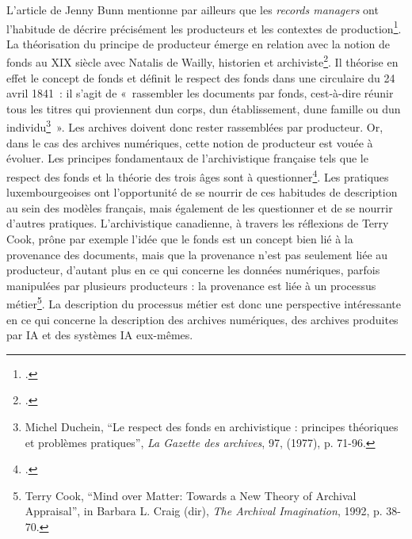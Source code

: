 	L'article de Jenny Bunn mentionne par ailleurs que les \emph{records managers} ont
	l'habitude de décrire précisément les producteurs et les contextes de
	production\footcite{bunn_working_2020}. La théorisation du principe de producteur
	émerge en relation avec la notion de fonds au XIX siècle avec Natalis
	de Wailly, historien et archiviste\footcite{guyon_theorie_2023}. Il
	théorise en effet le concept de fonds et définit le respect des fonds
	dans une circulaire du 24 avril 1841~: il s'agit de «~rassembler les
	documents par fonds, c\textquotesingle est-à-dire réunir tous les titres
	qui proviennent d\textquotesingle un corps, d\textquotesingle un
	établissement, d\textquotesingle une famille ou d\textquotesingle un
	individu\footnote{Michel Duchein, \enquote{Le respect des fonds en archivistique : principes théoriques et problèmes pratiques}, \emph{La Gazette des archives}, 97, (1977), p. 71-96.}~». Les archives doivent donc rester
	rassemblées par producteur. Or, dans le cas des archives numériques,
	cette notion de producteur est vouée à évoluer. Les principes
	fondamentaux de l'archivistique française tels que le respect des fonds
	et la théorie des trois âges sont à questionner\footcite{guyon_theorie_2023}. Les pratiques luxembourgeoises ont l'opportunité de se nourrir
	de ces habitudes de description au sein des modèles français, mais
	également de les questionner et de se nourrir d'autres pratiques.
	L'archivistique canadienne, à travers les réflexions de Terry Cook,
	prône par exemple l'idée que le fonds est un concept bien lié à la provenance
	des documents, mais que la provenance n'est pas seulement liée au
	producteur, d'autant plus en ce qui concerne les données numériques,
	parfois manipulées par plusieurs producteurs : la provenance est liée à un processus
	métier\footnote{Terry Cook, \enquote{Mind over Matter: Towards a New Theory of Archival Appraisal}, in Barbara L. Craig  (dir), \emph{The Archival Imagination}, 1992, p. 38-70.}. La description du processus métier est donc
	une perspective intéressante en ce qui concerne la description des
	archives numériques, des archives produites par IA et des systèmes IA
	eux-mêmes.\newline
	
